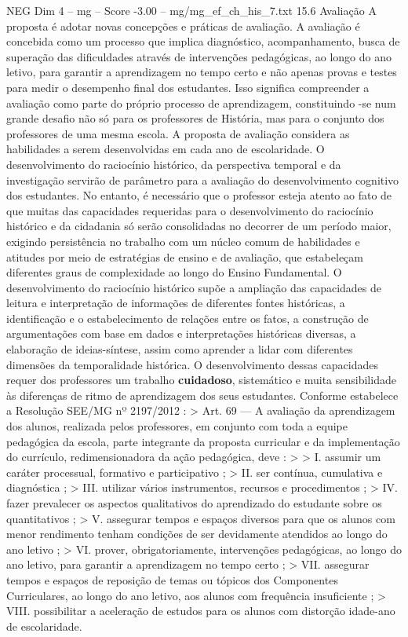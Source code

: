 \begin{textsample}{NEG Dim 4 – mg – Score -3.00 – mg/mg\_ef\_ch\_his\_7.txt}  \label{ex:f4_neg_093}
15.6 Avaliação A proposta é adotar novas concepções e práticas de avaliação.
A avaliação é concebida como um processo que implica diagnóstico, acompanhamento, busca de superação das dificuldades através de intervenções pedagógicas, ao longo do ano letivo, para garantir a aprendizagem no tempo certo e não apenas provas e testes para medir o desempenho final dos estudantes.
Isso significa compreender a avaliação como parte do próprio processo de aprendizagem, constituindo -se num grande desafio não só para os professores de História, mas para o conjunto dos professores de uma mesma escola.
A proposta de avaliação considera as habilidades a serem desenvolvidas em cada ano de escolaridade.
O desenvolvimento do raciocínio histórico, da perspectiva temporal e da investigação servirão de parâmetro para a avaliação do desenvolvimento cognitivo dos estudantes.
No entanto, é necessário que o professor esteja atento ao fato de que muitas das capacidades requeridas para o desenvolvimento do raciocínio histórico e da cidadania só serão consolidadas no decorrer de um período maior, exigindo persistência no trabalho com um núcleo comum de habilidades e atitudes por meio de estratégias de ensino e de avaliação, que estabeleçam diferentes graus de complexidade ao longo do Ensino Fundamental.
O desenvolvimento do raciocínio histórico supõe a ampliação das capacidades de leitura e interpretação de informações de diferentes fontes históricas, a identificação e o estabelecimento de relações entre os fatos, a construção de argumentações com base em dados e interpretações históricas diversas, a elaboração de ideias-síntese, assim como aprender a lidar com diferentes dimensões da temporalidade histórica.
O desenvolvimento dessas capacidades requer dos professores um trabalho \textbf{cuidadoso}, sistemático e muita sensibilidade às diferenças de ritmo de aprendizagem dos seus estudantes.
Conforme estabelece a Resolução SEE/MG nº 2197/2012 : > Art. 69 — A avaliação da aprendizagem dos alunos, realizada pelos professores, em conjunto com toda a equipe pedagógica da escola, parte integrante da proposta curricular e da implementação do currículo, redimensionadora da ação pedagógica, deve : > > I. assumir um caráter processual, formativo e participativo ; > II. ser contínua, cumulativa e diagnóstica ; > III. utilizar vários instrumentos, recursos e procedimentos ; > IV. fazer prevalecer os aspectos qualitativos do aprendizado do estudante sobre os quantitativos ; > V. assegurar tempos e espaços diversos para que os alunos com menor rendimento tenham condições de ser devidamente atendidos ao longo do ano letivo ; > VI. prover, obrigatoriamente, intervenções pedagógicas, ao longo do ano letivo, para garantir a aprendizagem no tempo certo ; > VII. assegurar tempos e espaços de reposição de temas ou tópicos dos Componentes Curriculares, ao longo do ano letivo, aos alunos com frequência insuficiente ; > VIII. possibilitar a aceleração de estudos para os alunos com distorção idade-ano de escolaridade.

\end{textsample}
